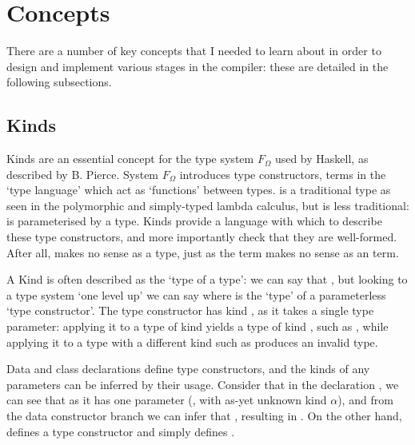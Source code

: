 \documentclass[dissertation.tex]{subfiles}
\begin{document}
\section{Concepts}
{
    There are a number of key concepts that I needed to learn about in order to design and implement various stages in the compiler: these are detailed in the following subsections.

    \subsection{Kinds}\label{sec:kinds}
    {
        Kinds are an essential concept for the type system \(F_\Omega\) used by Haskell, as described by B. Pierce\cite{TAPL}. System \(F_\Omega\) introduces type constructors, terms in the `type language' which act as `functions' between types.  is a traditional type as seen in the polymorphic and simply-typed lambda calculus, but  is less traditional:  is parameterised by a type. Kinds provide a language with which to describe these type constructors, and more importantly check that they are well-formed. After all,  makes no sense as a type, just as the term  makes no sense as an term.

        A Kind is often described as the `type of a type': we can say that , but looking to a type system `one level up' we can say  where \haskell{*} is the `type' of a parameterless `type constructor'. The type constructor  has kind \haskell{* -> *}, as it takes a single type parameter: applying it to a type of kind \haskell{*} yields a type of kind \haskell{*}, such as , while applying it to a type with a different kind such as  produces an invalid type.

        Data and class declarations define type constructors, and the kinds of any parameters can be inferred by their usage. Consider that in the declaration , we can see that  as it has one parameter (, with as-yet unknown kind \(\alpha\)), and from the data constructor branch  we can infer that \haskell{#\(\alpha\)# = *}, resulting in . On the other hand,  defines a type constructor  and  simply defines .

}}
\end{document}

